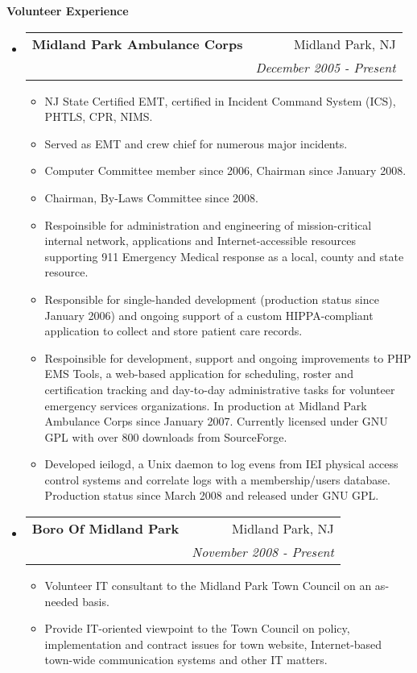 \documentclass[letterpaper,11pt]{article}
\makeatletter
\newcommand{\resitem}[1]{\item #1 \vspace{-2pt}}
\newcommand{\resheading}[1]{{\large \colorbox{mygrey}{\begin{minipage}{\textwidth}{\textbf{#1 \vphantom{p\^{E}}}}\end{minipage}}}}
\newcommand{\ressubheading}[4]{
\begin{tabular*}{7.0in}{l@{\extracolsep{\fill}}r}
		\textbf{#1} & #2 \\
		\textit{#3} & \textit{#4} \\
\end{tabular*}\vspace{-6pt}}
\makeatother
\begin{document}
\resheading{Volunteer Experience}
\begin{itemize}
\item
        \ressubheading{Midland Park Ambulance Corps}{Midland Park, NJ}{ }{December 2005 - Present}
        \begin{itemize}
                \resitem{NJ State Certified EMT, certified in Incident Command
                System (ICS), PHTLS, CPR, NIMS.}
                \resitem{Served as EMT and crew chief for numerous major
                  incidents.}
                \resitem{Computer Committee member since 2006, Chairman since
                  January 2008.}
                \resitem{Chairman, By-Laws Committee since 2008.}
                \resitem{Respoinsible for administration and engineering of
                  mission-critical internal network, applications and
                  Internet-accessible resources supporting 911 Emergency
                  Medical response as a local, county and state resource.}
                \resitem{Responsible for single-handed development (production
                  status since January 2006) and ongoing support of a custom
                  HIPPA-compliant application to collect and store patient
                  care records.}
                \resitem{Respoinsible for development, support and ongoing
                  improvements to PHP EMS Tools, a web-based application for
                  scheduling, roster and certification tracking and day-to-day
                administrative tasks for volunteer emergency services
                organizations. In production at Midland Park Ambulance Corps
                since January 2007. Currently licensed under GNU GPL with over
                800 downloads from SourceForge.}
                \resitem{Developed ieilogd, a Unix daemon to log evens from
                  IEI physical access control systems and correlate logs with
                  a membership/users database. Production status since March
                  2008 and released under GNU GPL.}
        \end{itemize}

\item
        \ressubheading{Boro Of Midland Park}{Midland Park, NJ}{}{November 2008 - Present}
        \begin{itemize}
                \resitem{Volunteer IT consultant to the Midland Park Town
                  Council on an as-needed basis.}
                \resitem{Provide IT-oriented viewpoint to the Town Council on
                  policy, implementation and contract issues for town website,
                  Internet-based town-wide communication systems and other IT matters.}
        \end{itemize}
\end{itemize}
\end{document}
